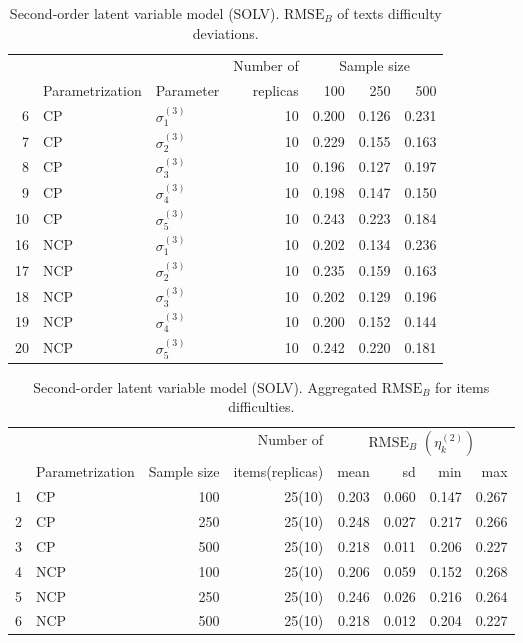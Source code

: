%
\begin{table}[H]
	\centering
	\begin{tabular}{rllrrrr}
		\hline
		\multicolumn{3}{c}{ } & Number of &\multicolumn{3}{c}{ Sample size } \\ 
		\cmidrule(rl){5-7}
		& Parametrization & Parameter & replicas & 100 & 250 & 500 \\  
		\hline\hline
		6 & CP & $\sigma^{(3)}_{1}$ &   10 & 0.200 & 0.126 & 0.231 \\ 
		7 & CP & $\sigma^{(3)}_{2}$ &   10 & 0.229 & 0.155 & 0.163 \\ 
		8 & CP & $\sigma^{(3)}_{3}$ &   10 & 0.196 & 0.127 & 0.197 \\ 
		9 & CP & $\sigma^{(3)}_{4}$ &   10 & 0.198 & 0.147 & 0.150 \\ 
		10 & CP & $\sigma^{(3)}_{5}$ &   10 & 0.243 & 0.223 & 0.184 \\ 
		\hline
		16 & NCP & $\sigma^{(3)}_{1}$ &   10 & 0.202 & 0.134 & 0.236 \\ 
		17 & NCP & $\sigma^{(3)}_{2}$ &   10 & 0.235 & 0.159 & 0.163 \\ 
		18 & NCP & $\sigma^{(3)}_{3}$ &   10 & 0.202 & 0.129 & 0.196 \\ 
		19 & NCP & $\sigma^{(3)}_{4}$ &   10 & 0.200 & 0.152 & 0.144 \\ 
		20 & NCP & $\sigma^{(3)}_{5}$ &   10 & 0.242 & 0.220 & 0.181 \\ 
		\hline
	\end{tabular}
	\caption[Second-order latent variable model (SOLV). $\text{RMSE}_{B}$ of texts difficulty deviations.]%
	{Second-order latent variable model (SOLV). $\text{RMSE}_{B}$ of texts difficulty deviations.}
	\label{tab:SOLV_RMSE_texts_dev}
\end{table}
%
\begin{table}[ht]
	\centering
	\begin{tabular}{rlrrrrrr}
		\hline
		\multicolumn{3}{c}{ } & Number of &\multicolumn{4}{c}{ $\text{RMSE}_{B}$ $( \eta^{(2)}_{k} )$ } \\ 
		\cmidrule(rl){5-8}
		& Parametrization & Sample size & items(replicas) & mean & sd & min & max \\  
		\hline\hline
		1 & CP &  100 & 25(10) & 0.203 & 0.060 & 0.147 & 0.267 \\ 
		2 & CP &  250 & 25(10) & 0.248 & 0.027 & 0.217 & 0.266 \\
		3 & CP &  500 & 25(10) & 0.218 & 0.011 & 0.206 & 0.227 \\  
		\hline
		4 & NCP &  100 & 25(10) & 0.206 & 0.059 & 0.152 & 0.268 \\ 
		5 & NCP &  250 & 25(10) & 0.246 & 0.026 & 0.216 & 0.264 \\
		6 & NCP &  500 & 25(10) & 0.218 & 0.012 & 0.204 & 0.227 \\ 
		\hline
	\end{tabular}
	\caption[Second-order latent variable model (SOLV). Aggregated $\text{RMSE}_{B}$ for items difficulties.]%
	{Second-order latent variable model (SOLV). Aggregated $\text{RMSE}_{B}$ for items difficulties.}
	\label{tab:SOLV_RMSE_items}
\end{table}
